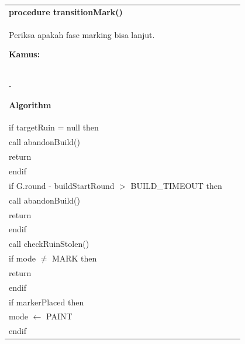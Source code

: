 \documentclass{article}
\newenvironment{pseudobox}
{
\centering
\begin{longtable}{|p{0.94\linewidth}|}
\hline
}
{
\\ \hline
\end{longtable}
\vspace{0.05cm}
}
\begin{document}
\begin{pseudobox}
\textbf{procedure transitionMark()} \\
{ Periksa apakah fase marking bisa lanjut. }

\textbf{Kamus:} \\
\hspace*{1em} -

\textbf{Algorithm} \\
\hspace*{1em} if targetRuin = null then \\
\hspace*{2em} call abandonBuild() \\
\hspace*{2em} return \\
\hspace*{1em} endif \\

\hspace*{1em} if G.round - buildStartRound $>$ BUILD\_TIMEOUT then \\
\hspace*{2em} call abandonBuild() \\
\hspace*{2em} return \\
\hspace*{1em} endif \\

\hspace*{1em} call checkRuinStolen() \\

\hspace*{1em} if mode $\neq$ MARK then \\
\hspace*{2em} return \\
\hspace*{1em} endif \\

\hspace*{1em} if markerPlaced then \\
\hspace*{2em} mode $\leftarrow$ PAINT \\
\hspace*{1em} endif
\end{pseudobox}
\end{document}
